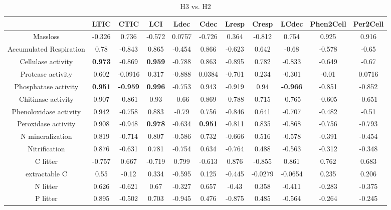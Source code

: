 \documentclass[authoryear,preprint,review,12pt]{elsarticle}
\begin{document}
\newpage
\begin{table}[h!]
\begin{center}
\caption{H3 vs. H2}
\label{morecorr1}
{\tiny
\begin{tabular}{ccccccccccc}
  \hline
 & LTIC & CTIC & LCI & Ldec & Cdec & Lresp & Cresp & LCdec & Phen2Cell & Per2Cell \\ 
  \hline
Massloss & -0.326 & 0.736 & -0.572 & 0.0757 & -0.726 & 0.364 & -0.812 & 0.754 & 0.925 & 0.916 \\ 
  Accumulated Respiration & 0.78 & -0.843 & 0.865 & -0.454 & 0.866 & -0.623 & 0.642 & -0.68 & -0.578 & -0.65 \\ 
  Cellulase activity & \textbf{ 0.973 } & -0.869 & \textbf{ 0.959 } & -0.788 & 0.863 & -0.895 & 0.782 & -0.833 & -0.649 & -0.67 \\ 
  Protease activity & 0.602 & -0.0916 & 0.317 & -0.888 & 0.0384 & -0.701 & 0.234 & -0.301 & -0.01 & 0.0716 \\ 
  Phosphatase activity & \textbf{ 0.951 } & \textbf{ -0.959 } & \textbf{ 0.996 } & -0.753 & 0.943 & -0.919 & 0.94 & \textbf{ -0.966 } & -0.851 & -0.852 \\ 
  Chitinase activity & 0.907 & -0.861 & 0.93 & -0.66 & 0.869 & -0.788 & 0.715 & -0.765 & -0.605 & -0.651 \\ 
  Phenoloxidase activity & 0.942 & -0.758 & 0.883 & -0.79 & 0.756 & -0.846 & 0.641 & -0.707 & -0.482 & -0.51 \\ 
  Peroxidase activity & 0.908 & -0.948 & \textbf{ 0.978 } & -0.634 & \textbf{ 0.951 } & -0.811 & 0.835 & -0.868 & -0.756 & -0.793 \\ 
  N mineralization & 0.819 & -0.714 & 0.807 & -0.586 & 0.732 & -0.666 & 0.516 & -0.578 & -0.391 & -0.454 \\ 
  Nitrification & 0.876 & -0.631 & 0.781 & -0.754 & 0.634 & -0.764 & 0.488 & -0.563 & -0.312 & -0.348 \\ 
  C litter & -0.757 & 0.667 & -0.719 & 0.799 & -0.613 & 0.876 & -0.855 & 0.861 & 0.762 & 0.683 \\ 
  extractable C & 0.55 & -0.12 & 0.334 & -0.595 & 0.125 & -0.445 & -0.0279 & -0.0654 & 0.235 & 0.206 \\ 
  N litter & 0.626 & -0.621 & 0.67 & -0.327 & 0.657 & -0.43 & 0.358 & -0.411 & -0.283 & -0.375 \\ 
  P litter & 0.895 & -0.502 & 0.703 & -0.945 & 0.476 & -0.875 & 0.485 & -0.564 & -0.264 & -0.245 \\ 

\end{tabular}}
\end{center}
\end{table}
\end{document}
